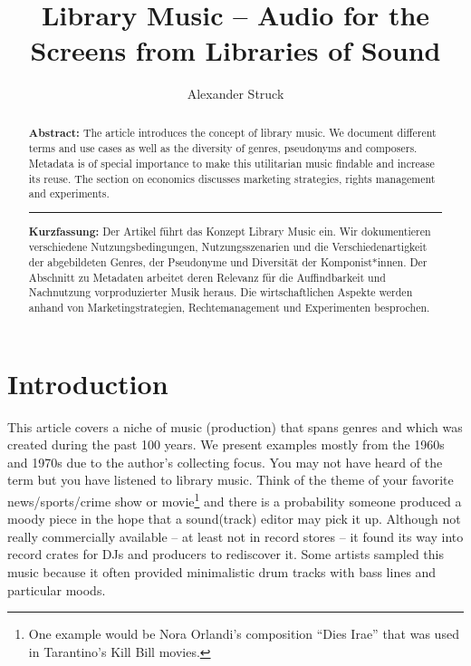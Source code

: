 \documentclass[a4paper,
fontsize=11pt,
oneside,
numbers=noperiodatend,
parskip=half-,
bibliography=totoc,
final
]{scrartcl}
\title{\LARGE{Library Music – Audio for the Screens from Libraries of Sound}}%
\author{Alexander Struck} %
\date{}
\begin{document}
\maketitle
\thispagestyle{fancyplain} 

\begin{abstract}
\noindent
\textbf{Abstract:} The article introduces the concept of library music.
We document different terms and use cases as well as the diversity of
genres, pseudonyms and composers. Metadata is of special importance to
make this utilitarian music findable and increase its reuse. The section
on economics discusses marketing strategies, rights management and
experiments.

\begin{center}\rule{0.5\linewidth}{0.5pt}\end{center}

\noindent
\textbf{Kurzfassung:} Der Artikel führt das Konzept Library Music ein.
Wir dokumentieren verschiedene Nutzungsbedingungen, Nutzungsszenarien
und die Verschiedenartigkeit der abgebildeten Genres, der Pseudonyme und
Diversität der Komponist*innen. Der Abschnitt zu Metadaten arbeitet
deren Relevanz für die Auffindbarkeit und Nachnutzung vorproduzierter
Musik heraus. Die wirtschaftlichen Aspekte werden anhand von
Marketingstrategien, Rechtemanagement und Experimenten besprochen.
\end{abstract}

\hypertarget{introduction}{%
\section{Introduction}\label{introduction}}

This article covers a niche of music (production) that spans genres and
which was created during the past 100 years. We present examples mostly
from the 1960s and 1970s due to the author's collecting focus. You may
not have heard of the term but you have listened to library music. Think
of the theme of your favorite news/sports/crime show or movie\footnote{One
  example would be Nora Orlandi's composition \enquote{Dies Irae} that
  was used in Tarantino's Kill Bill movies.} and there is a probability
someone produced a moody piece in the hope that a sound(track) editor
may pick it up. Although not really commercially available -- at least
not in record stores -- it found its way into record crates for DJs and
producers to rediscover it. Some artists sampled this music because it
often provided minimalistic drum tracks with bass lines and particular
moods.
\end{document}
